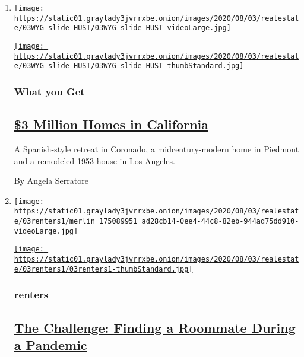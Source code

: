 \begin{enumerate}
\def\labelenumi{\arabic{enumi}.}
\item
  \texttt{[image: https://static01.graylady3jvrrxbe.onion/images/2020/08/03/realestate/03WYG-slide-HUST/03WYG-slide-HUST-videoLarge.jpg]}

  \href{/2020/08/03/realestate/3-million-dollar-homes-for-sale-ca.html}{\texttt{[image: https://static01.graylady3jvrrxbe.onion/images/2020/08/03/realestate/03WYG-slide-HUST/03WYG-slide-HUST-thumbStandard.jpg]}}

  \hypertarget{what-you-get}{%
  \subsubsection{What you Get}\label{what-you-get}}

  \hypertarget{3-million-homes-in-california}{%
  \subsection{\texorpdfstring{\href{/2020/08/03/realestate/3-million-dollar-homes-for-sale-ca.html}{\$3
  Million Homes in
  California}}{\$3 Million Homes in California}}\label{3-million-homes-in-california}}

  A Spanish-style retreat in Coronado, a midcentury-modern home in
  Piedmont and a remodeled 1953 house in Los Angeles.

  By Angela Serratore
\item
  \texttt{[image: https://static01.graylady3jvrrxbe.onion/images/2020/08/03/realestate/03renters1/merlin\_175089951\_ad28cb14-0ee4-44c8-82eb-944ad75dd910-videoLarge.jpg]}

  \href{/2020/08/03/realestate/coronavirus-roommate-renters.html}{\texttt{[image: https://static01.graylady3jvrrxbe.onion/images/2020/08/03/realestate/03renters1/03renters1-thumbStandard.jpg]}}

  \hypertarget{renters}{%
  \subsubsection{renters}\label{renters}}

  \hypertarget{the-challenge-finding-a-roommate-during-a-pandemic}{%
  \subsection{\texorpdfstring{\href{/2020/08/03/realestate/coronavirus-roommate-renters.html}{The
  Challenge: Finding a Roommate During a
  Pandemic}}{The Challenge: Finding a Roommate During a Pandemic}}\label{the-challenge-finding-a-roommate-during-a-pandemic}}


\end{enumerate}
